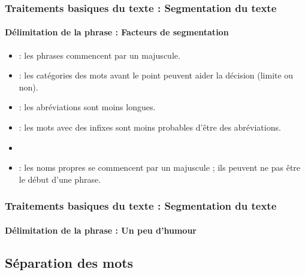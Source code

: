 \documentclass[xcolor=table]{beamer}
\begin{document}
\begin{frame}
\frametitle{Traitements basiques du texte : Segmentation du texte}
\framesubtitle{Délimitation de la phrase : Facteurs de segmentation} 

\begin{itemize}
	\item {} : les phrases commencent par un majuscule.
	\item {} : les catégories des mots avant le point peuvent aider la décision (limite ou non).
	\item {} : les abréviations sont moins longues.
	\item {} : les mots avec des infixes sont moins probables d'être des abréviations.
	\item {} 
	\item {} : les noms propres se commencent par un majuscule ; ils peuvent ne pas être le début d'une phrase.
\end{itemize}

\end{frame}

\begin{frame}
\frametitle{Traitements basiques du texte : Segmentation du texte}
\framesubtitle{Délimitation de la phrase : Un peu d'humour} 


\end{frame}

\subsection{Séparation des mots}
\end{document}
